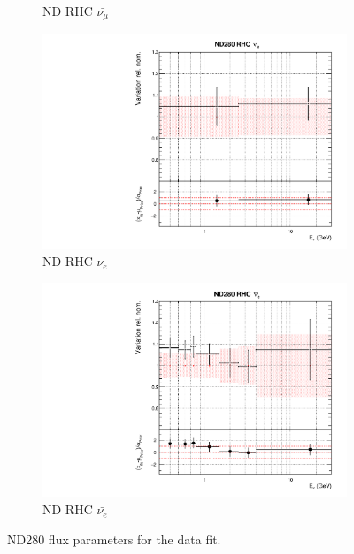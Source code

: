 \begin{figure}
\begin{subfigure}{0.45\textwidth}
  \caption{ND RHC $\bar{\nu_{\mu}}$}
\end{subfigure}
\begin{subfigure}{0.45\textwidth}
  \centering
  \includegraphics[width=0.75\linewidth]{figs/datflux6}
  \caption{ND RHC $\nu_{e}$}
\end{subfigure}
\begin{subfigure}{0.45\textwidth}
  \centering
  \includegraphics[width=0.75\linewidth]{figs/datflux7}
  \caption{ND RHC $\bar{\nu_e}$}
\end{subfigure}
\caption{ND280 flux parameters for the data fit.}
\label{fig:datfluxND}
\end{figure}

